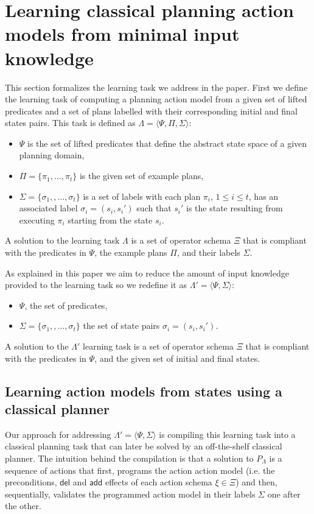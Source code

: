 \documentclass[letterpaper]{article} %
\newcommand{\tup}[1]{{\langle #1 \rangle}}
\newcommand{\del}{\mathsf{del}}     %
\newcommand{\add}{\mathsf{add}}     %
\begin{document}
\section{Learning classical planning action models from minimal input knowledge}
This section formalizes the learning task we address in the paper. First we define the learning task of computing a planning action model from a given set of lifted predicates and a set of plans labelled with their corresponding initial and final states pairs. This task is defined as $\Lambda=\tup{\Psi,\Pi,\Sigma}$: 
\begin{itemize}
\item $\Psi$ is the set of lifted predicates that define the abstract state space of a given planning domain,
\item $\Pi=\{\pi_1,\ldots,\pi_t\}$ is the given set of example plans,
\item $\Sigma=\{\sigma_1,,\ldots,\sigma_t\}$ is a set of labels with each plan $\pi_i$, {\small $1\leq i\leq t$}, has an associated label $\sigma_i=(s_i,s_i')$ such that $s_i'$ is the state resulting from executing $\pi_i$ starting from the state $s_i$. 
\end{itemize}

A solution to the learning task $\Lambda$ is a set of operator schema $\Xi$ that is compliant with the predicates in $\Psi$, the example plans $\Pi$, and their labels $\Sigma$.

As explained in this paper we aim to reduce the amount of input knowledge provided to the learning task so we redefine it as $\Lambda'=\tup{\Psi,\Sigma}$: 
\begin{itemize}
\item $\Psi$, the set of predicates,
\item $\Sigma=\{\sigma_1,,\ldots,\sigma_t\}$ the set of state pairs $\sigma_i=(s_i,s_i')$. 
\end{itemize}
A solution to the $\Lambda'$ learning task is a set of operator schema $\Xi$ that is compliant with the predicates in $\Psi$, and the given set of initial and final states.


\subsection{Learning action models from states using a classical planner}
Our approach for addressing $\Lambda'=\tup{\Psi,\Sigma}$ is compiling this learning task into a classical planning task that can later be solved by an off-the-shelf classical planner. The intuition behind the compilation is that a solution to $P_{\Lambda}$ is a sequence of actions that first, programs the action action model (i.e. the preconditions, $\del$ and $\add$ effects of each action schema $\xi\in\Xi$) and then, sequentially, validates the programmed action model in their labels $\Sigma$ one after the other.
\end{document}
